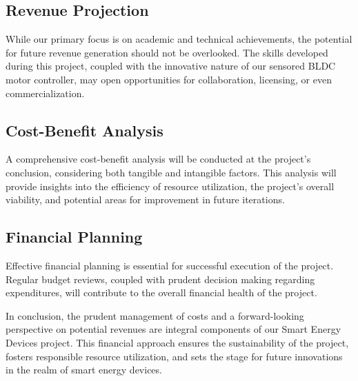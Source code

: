 \subsection{Revenue Projection}
While our primary focus is on academic and technical achievements, the potential for future revenue generation should not be overlooked. The skills developed during this project, coupled with the innovative nature of our sensored BLDC motor controller, may open opportunities for collaboration, licensing, or even commercialization.

\subsection{Cost-Benefit Analysis}
A comprehensive cost-benefit analysis will be conducted at the project's conclusion, considering both tangible and intangible factors. This analysis will provide insights into the efficiency of resource utilization, the project's overall viability, and potential areas for improvement in future iterations.

\subsection{Financial Planning}
Effective financial planning is essential for successful execution of the project. Regular budget reviews, coupled with prudent decision making regarding expenditures, will contribute to the overall financial health of the project.

In conclusion, the prudent management of costs and a forward-looking perspective on potential revenues are integral components of our Smart Energy Devices project. This financial approach ensures the sustainability of the project, fosters responsible resource utilization, and sets the stage for future innovations in the realm of smart energy devices.
